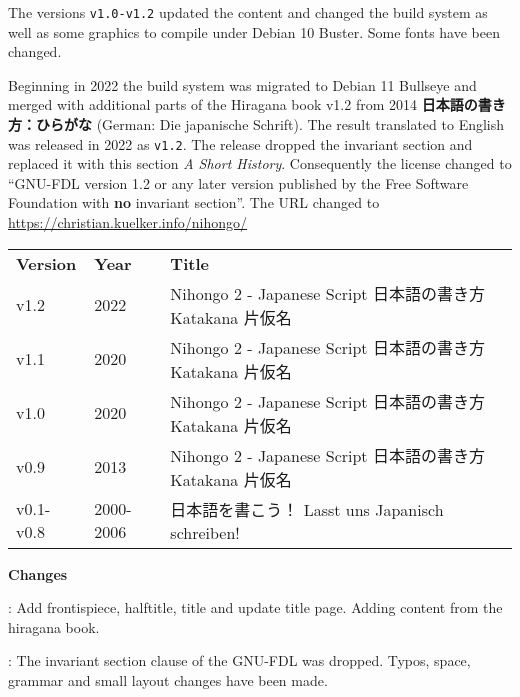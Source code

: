 \begin{flushleft}
{The versions \texttt{v1.0-v1.2} updated the content and changed the build
system as well as some graphics to compile under Debian 10 Buster. Some fonts
have been changed.\medskip

Beginning in 2022 the build system was migrated to Debian 11 Bullseye and
merged with additional parts of the Hiragana book v1.2 from 2014
\textbf{日本語の書き方：ひらがな} (German: Die japanische Schrift). The result
translated to English was released in 2022 as \texttt{v1.2}. The release
dropped the invariant section and replaced it with this section \textit{A Short
History}. Consequently the license changed to “GNU-FDL version 1.2 or any later
version published by the Free Software Foundation with \textbf{no} invariant
section”. The URL changed to \url{https://christian.kuelker.info/nihongo/}

}
\medskip

\begin{center}
\footnotesize
\begin{tabular}{lll}
\textbf{Version}&\textbf{Year}&\textbf{Title}\\
v1.2&2022&Nihongo 2 - Japanese Script 日本語の書き方 Katakana 片仮名\\
v1.1&2020&Nihongo 2 - Japanese Script 日本語の書き方 Katakana 片仮名\\
v1.0&2020&Nihongo 2 - Japanese Script 日本語の書き方 Katakana 片仮名\\
v0.9&2013&Nihongo 2 - Japanese Script 日本語の書き方 Katakana 片仮名\\
v0.1-v0.8&2000-2006&日本語を書こう！ Lasst uns Japanisch schreiben!\\
\end{tabular}
\end{center}

\fontsize{12pt}{12pt}\selectfont\sffamily
\textbf{Changes}

{\jfontsizenine
\begin{description}\jfontsizenine
        \setlength{\itemsep}{0pt}%
        \setlength{\parskip}{0pt}%

        \item[\jfontsizenine\texttt{v1.2}]: Add frontispiece, halftitle, title
                and update title page. Adding content from the hiragana book.

        \item[\jfontsizenine\texttt{v1.1}]: The invariant section clause of the
                GNU-FDL was dropped.  Typos, space, grammar and small layout
                changes have been made.


\end{description}}
\end{flushleft}
